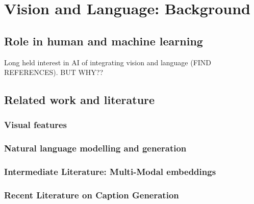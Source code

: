\chapter{Vision and Language: Background} \label{chapter:background} 

\section{Role in human and machine learning}
Long held interest in AI of integrating vision and language (FIND REFERENCES). BUT WHY?? 
\section{Related work and literature}
\subsection{Visual features}
\subsection{Natural language modelling and generation}
\subsection{Intermediate Literature: Multi-Modal embeddings}
\subsection{Recent Literature on Caption Generation}
